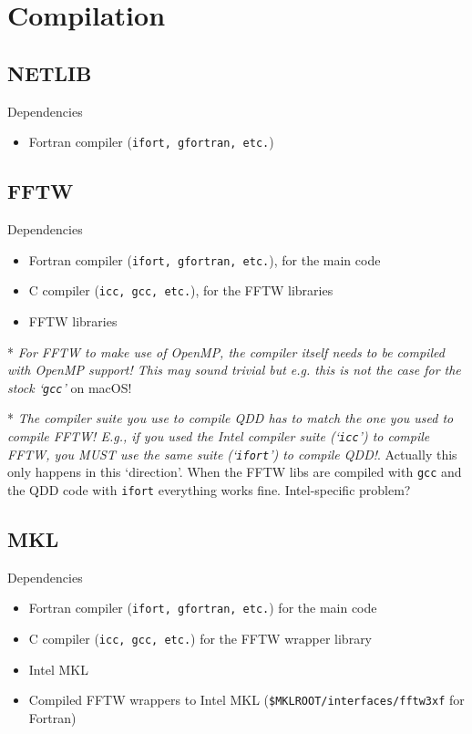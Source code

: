 \documentclass[11pt]{article}
\begin{document}
	\section{Compilation}
		\subsection{NETLIB}
			Dependencies
			\begin{itemize}
				\item Fortran compiler (\texttt{ifort, gfortran, etc.})
			\end{itemize}
			
		\subsection{FFTW}
			Dependencies
			\begin{itemize}
				\item Fortran compiler (\texttt{ifort, gfortran, etc.}), for the main code
				\item C compiler (\texttt{icc, gcc, etc.}), for the FFTW libraries
				\item FFTW libraries
			\end{itemize}
			{\color{red}* \emph{For FFTW to make use of OpenMP, the compiler itself needs to be compiled with OpenMP support! This may sound trivial but e.g. this is not the case for the stock `\texttt{gcc}'} on macOS!}
			
			{\color{red}* \emph{The compiler suite you use to compile QDD has to match the one you used to compile FFTW! E.g., if you used the Intel compiler suite (`\texttt{icc}') to compile FFTW, you MUST use the same suite (`\texttt{ifort}') to compile QDD!}. Actually this only happens in this `direction'. When the FFTW libs are compiled with \texttt{gcc} and the QDD code with \texttt{ifort} everything works fine. Intel-specific problem?}
			
		\subsection{MKL}
			Dependencies
			\begin{itemize}
				\item Fortran compiler (\texttt{ifort, gfortran, etc.}) for the main code
				\item C compiler (\texttt{icc, gcc, etc.}) for the FFTW wrapper library
				\item Intel MKL
				\item Compiled FFTW wrappers to Intel MKL (\texttt{\$MKLROOT/interfaces/fftw3xf} for Fortran)
			\end{itemize}
			
\end{document}
